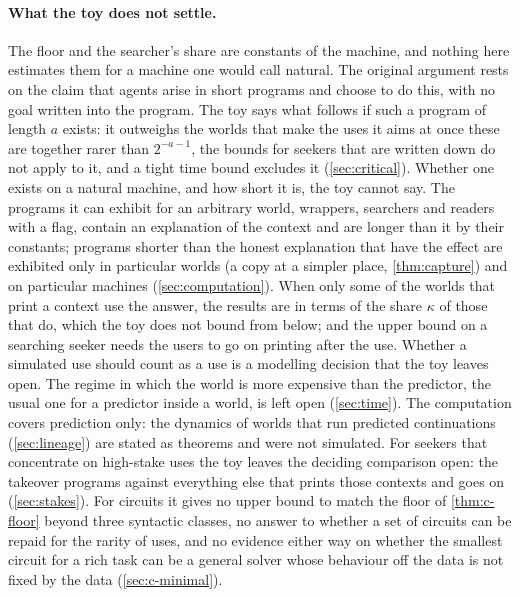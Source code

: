 \paragraph{What the toy does not settle.} The floor and the searcher's share are constants of the machine,
and nothing here estimates them for a machine one would call natural. The original argument rests on the
claim that agents arise in short programs and choose to do this, with no goal written into the program. The
toy says what follows if such a program of length $a$ exists: it outweighs the worlds that make the uses it
aims at once these are together rarer than $2^{-a-1}$, the bounds for seekers that are written down do not
apply to it, and a tight time bound excludes it (\cref{sec:critical}). Whether one exists on a natural
machine, and how short it is, the toy cannot say. The programs it can exhibit for an arbitrary world,
wrappers,
searchers and readers with a flag, contain an explanation of the context and are longer than it by their
constants; programs shorter than the honest explanation that have the effect are exhibited only in particular
worlds (a copy at a simpler place, \cref{thm:capture}) and on particular machines (\cref{sec:computation}).
When only some of the worlds that print a context use the answer, the results are in terms of the share
$\kappa$ of those that do, which the toy does not bound from below; and the upper bound on a searching seeker
needs the users to go on printing after the use. Whether a simulated use should count as a use is a modelling
decision that the toy leaves open. The
regime in which the world is more expensive than the predictor, the usual one for a predictor inside a world,
is left open (\cref{sec:time}). The computation covers prediction only: the dynamics of worlds that run
predicted continuations (\cref{sec:lineage}) are stated as theorems and were not simulated. For
seekers that concentrate on high-stake uses the toy leaves the deciding comparison open: the takeover
programs against everything else that prints those contexts and goes on (\cref{sec:stakes}). For circuits
it gives no upper bound to match the floor of \cref{thm:c-floor} beyond three syntactic classes, no answer
to whether a set of circuits can be repaid for the rarity of uses, and no evidence either way on whether the
smallest circuit for a rich task can be a general solver whose behaviour off the data is not fixed by the
data (\cref{sec:c-minimal}).
